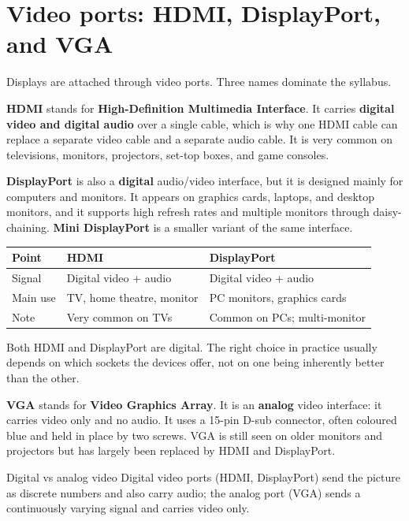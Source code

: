 \section{Video ports: HDMI, DisplayPort, and VGA}
Displays are attached through video ports. Three names dominate the syllabus.

\textbf{HDMI} stands for \textbf{High-Definition Multimedia Interface}. It
carries \textbf{digital video and digital audio} over a single cable, which
is why one HDMI cable can replace a separate video cable and a separate audio
cable. It is very common on televisions, monitors, projectors, set-top boxes,
and game consoles.

\textbf{DisplayPort} is also a \textbf{digital} audio/video interface, but it
is designed mainly for computers and monitors. It appears on graphics cards,
laptops, and desktop monitors, and it supports high refresh rates and
multiple monitors through daisy-chaining. \textbf{Mini DisplayPort} is a
smaller variant of the same interface.

\begin{center}
\begin{tabular}{p{}p{}p{}}
\toprule
\textbf{Point} & \textbf{HDMI} & \textbf{DisplayPort} \\
\midrule
Signal & Digital video + audio & Digital video + audio \\
Main use & TV, home theatre, monitor & PC monitors, graphics cards \\
Note & Very common on TVs & Common on PCs; multi-monitor \\
\bottomrule
\end{tabular}
\end{center}

Both HDMI and DisplayPort are digital. The right choice in practice usually
depends on which sockets the devices offer, not on one being inherently
better than the other.

\textbf{VGA} stands for \textbf{Video Graphics Array}. It is an
\textbf{analog} video interface: it carries video only and no audio. It uses
a 15-pin D-sub connector, often coloured blue and held in place by two
screws. VGA is still seen on older monitors and projectors but has largely
been replaced by HDMI and DisplayPort.

\begin{definitionbox}{Digital vs analog video}
Digital video ports (HDMI, DisplayPort) send the picture as discrete numbers
and also carry audio; the analog port (VGA) sends a continuously varying
signal and carries video only.
\end{definitionbox}

